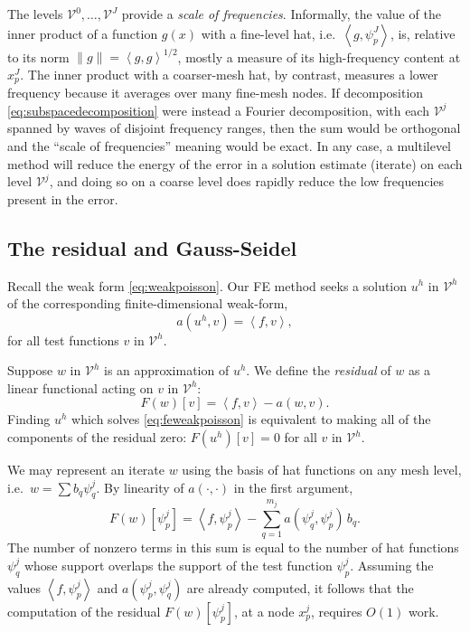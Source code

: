 \documentclass[letterpaper,final,12pt,reqno]{amsart}
\theoremstyle{claim}
\newcommand{\ip}[2]{\left<#1,#2\right>}
\numberwithin{equation}{section}
\numberwithin{figure}{section}
\numberwithin{table}{section}
\begin{document}
The levels $\mathcal{V}^0,\dots,\mathcal{V}^J$ provide a \emph{scale of frequencies}.  Informally, the value of the inner product of a function $g(x)$ with a fine-level hat, i.e.~$\ip{g}{\psi_p^J}$, is, relative to its norm $\|g\| = \ip{g}{g}^{1/2}$, mostly a measure of its high-frequency content at $x_p^J$.  The inner product with a coarser-mesh hat, by contrast, measures a lower frequency because it averages over many fine-mesh nodes.  If decomposition \eqref{eq:subspacedecomposition} were instead a Fourier decomposition, with each $\mathcal{V}^j$ spanned by waves of disjoint frequency ranges, then the sum would be orthogonal and the ``scale of frequencies'' meaning would be exact.  In any case, a multilevel method will reduce the energy of the error in a solution estimate (iterate) on each level $\mathcal{V}^j$, and doing so on a coarse level does rapidly reduce the low frequencies present in the error.

\subsection*{The residual and Gauss-Seidel}  Recall the weak form \eqref{eq:weakpoisson}.  Our FE method seeks a solution $u^h$ in $\mathcal{V}^h$ of the corresponding finite-dimensional weak-form,
\begin{equation}
  a(u^h,v) = \ip{f}{v},  \label{eq:feweakpoisson}
\end{equation}
for all test functions $v$ in $\mathcal{V}^h$.

Suppose $w$ in $\mathcal{V}^h$ is an approximation of $u^h$.  We define the \emph{residual} of $w$ as a linear functional acting on $v$ in $\mathcal{V}^h$:
\begin{equation}
  F(w)[v] = \ip{f}{v} - a(w,v).  \label{eq:residual}
\end{equation}
Finding $u^h$ which solves \eqref{eq:feweakpoisson} is equivalent to making all of the components of the residual zero: $F(u^h)[v]=0$ for all $v$ in $\mathcal{V}^h$.

We may represent an iterate $w$ using the basis of hat functions on any mesh level, i.e.~$w = \sum b_q \psi_q^j$.  By linearity of $a(\cdot,\cdot)$ in the first argument,
\begin{equation}
  F(w)[\psi_p^j] = \ip{f}{\psi_p^j} - \sum_{q=1}^{m_j} a(\psi_q^j,\psi_p^j) \,b_q.  \label{eq:residualpoisson}
\end{equation}
The number of nonzero terms in this sum is equal to the number of hat functions $\psi_q^j$ whose support overlaps the support of the test function $\psi_p^j$.  Assuming the values $\ip{f}{\psi_p^j}$ and $a(\psi_p^j,\psi_q^j)$ are already computed, it follows that the computation of the residual $F(w)[\psi_p^j]$, at a node $x_p^j$, requires $O(1)$ work.
\end{document}
